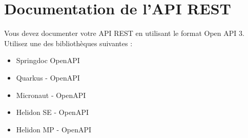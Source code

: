 \documentclass{article}
\begin{document}
\section{Documentation de l'API REST}

Vous devez documenter votre API REST en utilisant le format Open API 3. Utilisez une des bibliothèques suivantes :
\begin{itemize}
    \item Springdoc OpenAPI
    \item Quarkus - OpenAPI
    \item Micronaut - OpenAPI
    \item Helidon SE - OpenAPI
    \item Helidon MP - OpenAPI
\end{itemize}
\end{document}
